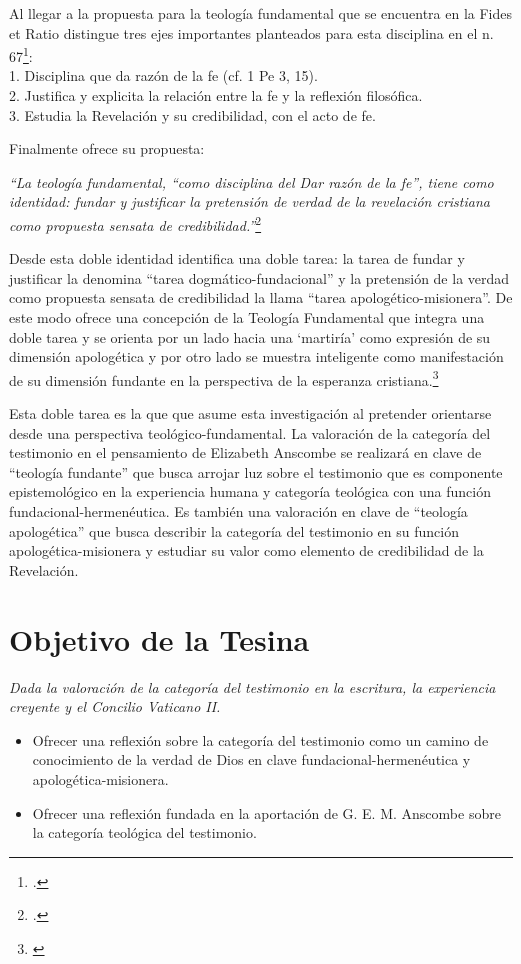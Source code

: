 \documentclass[11pt]{article}
\begin{document}
Al llegar a la propuesta para la teología fundamental que se encuentra en la Fides et Ratio distingue tres ejes importantes planteados para esta disciplina en el n. 67\footcite[49]{ninotTF}:\\1. Disciplina que da razón de la fe (cf. 1 Pe 3, 15).\\
2. Justifica y explicita la relación entre la fe y la reflexión filosófica.\\
3. Estudia la Revelación y su credibilidad, con el acto de fe.

Finalmente ofrece su propuesta:

\emph{
``La teología fundamental, ``como disciplina del Dar razón de la fe'', tiene como identidad: fundar y justificar la pretensión de verdad de la revelación cristiana como propuesta sensata de credibilidad.''}\footcite[72]{ninotTF}

Desde esta doble identidad identifica una doble tarea: la tarea de fundar y justificar la denomina ``tarea dogmático-fundacional'' y la pretensión de la verdad como propuesta sensata de credibilidad la llama ``tarea apologético-misionera''. De este modo ofrece una concepción de la Teología Fundamental que integra una doble tarea y se orienta por un lado hacia una `martiría' como expresión de su dimensión apologética y por otro lado se muestra inteligente como manifestación de su dimensión fundante en la perspectiva de la esperanza cristiana.\footnote{\cite[72]{ninotTF}}

Esta doble tarea es la que que asume esta investigación al pretender orientarse desde una perspectiva teológico-fundamental. La valoración de la categoría del testimonio en el pensamiento de Elizabeth Anscombe se realizará en clave de ``teología fundante'' que busca arrojar luz sobre el testimonio que es componente epistemológico en la experiencia humana y categoría teológica con una función fundacional-hermenéutica. Es también una valoración en clave de ``teología apologética'' que busca describir la categoría del testimonio en su función apologética-misionera y estudiar su valor como elemento de credibilidad de la Revelación.


\printbibliography[title={Referencias usadas en la presentación:},keyword=pres]

\part*{Objetivo de la Tesina}

\emph{Dada la valoración de la categoría del testimonio en la escritura, la experiencia creyente y el Concilio Vaticano II.}
\begin{itemize}
  \item Ofrecer una reflexión sobre la categoría del testimonio como un camino de conocimiento de la verdad de Dios en clave fundacional-hermenéutica y apologética-misionera.
  \item Ofrecer una reflexión fundada en la aportación de G. E. M. Anscombe sobre la categoría teológica del testimonio.
\end{itemize}
\end{document}
